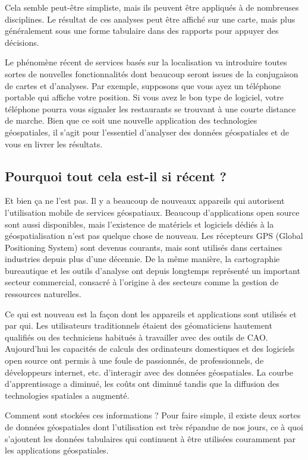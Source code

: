 Cela semble peut-être simpliste, mais ils peuvent être appliqués à de nombreuses disciplines. Le résultat de ces analyses peut être affiché sur une carte, mais plus généralement sous une forme tabulaire dans des rapports pour appuyer des décisions.

Le phénomène récent de services basés sur la localisation va introduire toutes sortes de nouvelles fonctionnalités dont beaucoup seront issues de la conjugaison de cartes et d'analyses. Par exemple, supposons que vous ayez un téléphone portable qui affiche votre position. Si vous avez le bon type de logiciel, votre téléphone pourra vous signaler les restaurants se trouvant à une courte distance de marche. Bien que ce soit une nouvelle application des technologies géospatiales, il s'agit pour l'essentiel d'analyser des données géospatiales et de vous en livrer les résultats.

\subsection{Pourquoi tout cela est-il si récent ?}\label{label_whynew}
Et bien ça ne l'est pas. Il y a beaucoup de nouveaux appareils qui autorisent l'utilisation mobile de services géospatiaux. Beaucoup d'applications open source sont aussi disponibles, mais l'existence de matériels et logiciels dédiés à la géospatialisation n'est pas quelque chose de nouveau. Les récepteurs GPS (Global Positioning System) sont devenus courants, mais sont utilisés dans certaines industries depuis plus d'une décennie. De la même manière, la cartographie bureautique et les outils d'analyse ont depuis longtemps représenté un important secteur commercial, consacré à l'origine à des secteurs comme la gestion de ressources naturelles.

Ce qui est nouveau est la façon dont les appareils et applications sont utilisés et par qui. Les utilisateurs traditionnels étaient des géomaticiens hautement qualifiés ou des techniciens habitués à travailler avec des outils de CAO. Aujourd'hui les capacités de calculs des ordinateurs domestiques et des logiciels open source ont permis à une foule de passionnés, de professionnels, de développeurs internet, etc. d'interagir avec des données géospatiales. La courbe d'apprentissage a diminué, les coûts ont diminué tandis que la diffusion des technologies spatiales a augmenté.

Comment sont stockées ces informations ? Pour faire simple, il existe deux sortes de données géospatiales dont l'utilisation est très répandue de nos jours, ce à quoi s'ajoutent les données tabulaires qui continuent à être utilisées couramment par les applications géospatiales.


